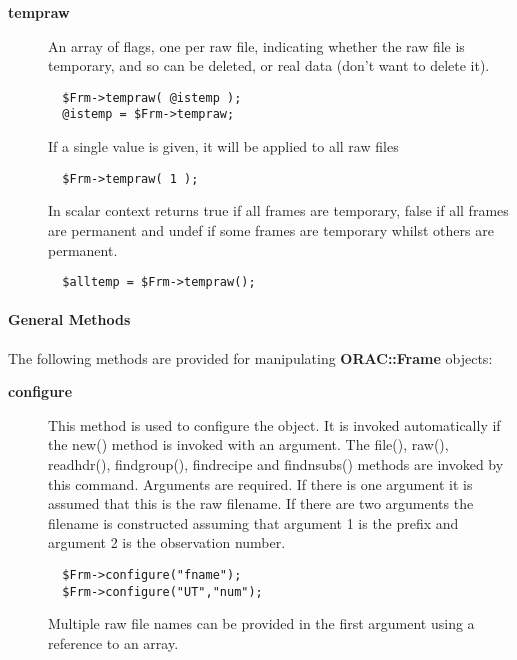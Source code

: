 \begin{description}
\begin{description}
\item[{\textbf{tempraw}}] \mbox{}

An array of flags, one per raw file, indicating whether the raw
file is temporary, and so can be deleted, or real data (don't want
to delete it).

\begin{verbatim}
  $Frm->tempraw( @istemp );
  @istemp = $Frm->tempraw;
\end{verbatim}


If a single value is given, it will be applied to all raw files

\begin{verbatim}
  $Frm->tempraw( 1 );
\end{verbatim}


In scalar context returns true if all frames are temporary,
false if all frames are permanent and undef if some frames are temporary
whilst others are permanent.

\begin{verbatim}
  $alltemp = $Frm->tempraw();
\end{verbatim}
\end{description}
\paragraph*{General Methods\label{ORAC::Frame_General_Methods}}


The following methods are provided for manipulating
\textbf{ORAC::Frame} objects:

\begin{description}

\item[{\textbf{configure}}] \mbox{}

This method is used to configure the object. It is invoked	 
automatically if the new() method is invoked with an argument. The	 
file(), raw(), readhdr(), findgroup(), findrecipe and findnsubs()	 
methods are invoked by this command. Arguments are required.  If there	 
is one argument it is assumed that this is the raw filename. If there	 
are two arguments the filename is constructed assuming that argument 1	 
is the prefix and argument 2 is the observation number.

\begin{verbatim}
  $Frm->configure("fname");      
  $Frm->configure("UT","num");
\end{verbatim}


Multiple raw file names can be provided in the first argument using	 
a reference to an array.



\end{description}
\end{description}
